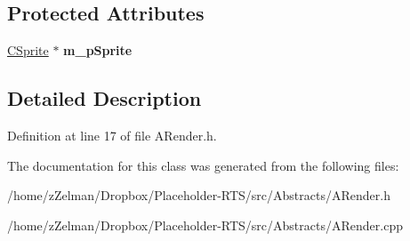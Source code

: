 \subsection*{Protected Attributes}
\begin{DoxyCompactItemize}
\item 
\hypertarget{classARender_a919ebd73d8965dae60a040e61478a874}{\hyperlink{classCSprite}{C\-Sprite} $\ast$ {\bfseries m\-\_\-p\-Sprite}}\label{classARender_a919ebd73d8965dae60a040e61478a874}

\end{DoxyCompactItemize}


\subsection{Detailed Description}


Definition at line 17 of file A\-Render.\-h.



The documentation for this class was generated from the following files\-:\begin{DoxyCompactItemize}
\item 
/home/z\-Zelman/\-Dropbox/\-Placeholder-\/\-R\-T\-S/src/\-Abstracts/A\-Render.\-h\item 
/home/z\-Zelman/\-Dropbox/\-Placeholder-\/\-R\-T\-S/src/\-Abstracts/A\-Render.\-cpp\end{DoxyCompactItemize}
